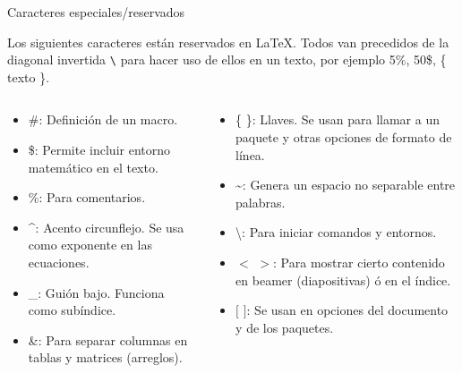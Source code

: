 \documentclass[aspectratio=169, 10pt]{beamer}
\begin{document}
\begin{frame}[fragile]{Caracteres especiales/reservados}

Los siguientes caracteres están reservados en \LaTeX. Todos van precedidos de la diagonal invertida \verb|\| para hacer uso de ellos en un texto, por ejemplo 5\%, 50\$, \{ texto \}.

    \begin{columns}
        \begin{column}{.5\linewidth}  
    \begin{itemize}
\item \#: Definición de un macro.
\item \$: Permite incluir entorno matemático en el texto.
\item \%: Para comentarios.
\item \^{}: Acento circunflejo. Se usa como exponente en las ecuaciones.
\item \_: Guión bajo. Funciona como subíndice.
\item \&: Para separar columnas en tablas y matrices (arreglos).


\end{itemize}
\end{column}

\begin{column}{.5\linewidth} 
    \begin{itemize}
        \item \{ \}: Llaves. Se usan para llamar a un paquete y otras opciones de formato de línea.
        \item \textasciitilde: \hspace{0.5mm} Genera un espacio no separable entre palabras.
        \item \textbackslash: \hspace{0.5mm} Para iniciar comandos y entornos.
        \item $<$ $>$: Para mostrar cierto contenido en beamer (diapositivas) ó en el índice.
        \item $[$ $]$: Se usan en opciones del documento y de los paquetes.
    \end{itemize}
\end{column}
\end{columns}
\end{frame}
\end{document}
